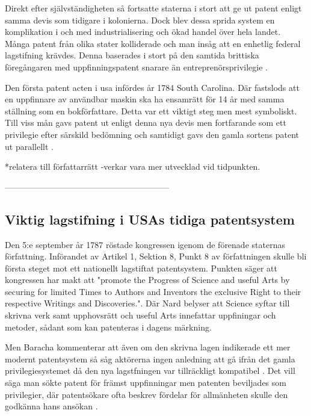 Direkt efter självständigheten så fortsatte staterna i stort att ge ut patent enligt samma devis som tidigare i
kolonierna. Dock blev dessa sprida system en komplikation i och med industrialisering och ökad handel över
hela landet. Många patent från olika stater kolliderade och man insåg att en enhetlig federal
lagstifning krävdes. Denna baserades i stort på den samtida brittiska föregångaren med uppfinningspatent
snarare än entreprenörsprivilegie \cite{nard}.

Den första patent acten i usa infördes år 1784 South Carolina. Där fastslods att en uppfinnare av
användbar maskin ska ha ensamrätt för 14 år med samma ställning som en bokförfattare\cite{bracha}. Detta var ett viktigt steg men mest symboliskt. Till viss mån gavs patent ut enligt
denna nya devis men fortfarande som ett privilegie efter särskild bedömning och samtidigt gavs den gamla
sortens patent ut parallellt \cite{bracha}.

*relatera till författarrätt -verkar vara mer utvecklad vid tidpunkten.


-----------------------------------------------------------

\subsection{Viktig lagstifning i USAs tidiga patentsystem}

Den 5:e september år 1787 röstade kongressen igenom de förenade staternas författning. Införandet av Artikel 1, Sektion 8, Punkt 8 av författningen skulle bli första steget mot ett nationellt lagstiftat patentsystem. Punkten säger att kongressen har
makt att "promote the Progress of Science and useful Arts by securing for limited Times to Authors and
Inventors the exclusive Right to their respective Writings and Discoveries.". Där Nard belyser att
Science syftar till skrivna verk samt upphovsrätt och useful Arts innefattar uppfiningar och metoder,
sådant som kan patenteras i dagens märkning\cite{nard}. 

Men Baracha kommenterar att även om den skrivna lagen indikerade ett mer modernt patentsystem så såg aktörerna ingen anledning att gå ifrån det gamla privilegiesystemet då den nya lagstfningen var tillräckligt kompatibel \cite{Bracha}. Det vill säga man sökte patent för främst uppfinningar men patenten beviljades som privilegier, där patentsökare ofta beskrev fördelar för allmänheten skulle den godkänna hans ansökan \cite{bracha}.

